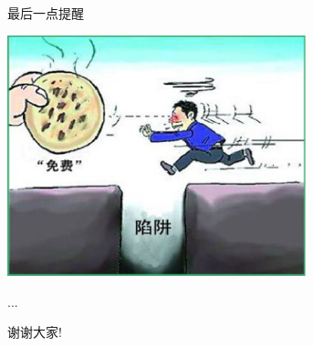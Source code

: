 \documentclass[dvipdfm]{beamer}
\begin{document}
\begin{frame}[t]{最后一点提醒}
  \begin{center}
  \includegraphics[height=7cm]{figure/warning.eps}
  \end{center}
\end{frame}

\begin{frame}[t]{...}
\vspace{5em}
\begin{center}
\Huge{谢谢大家!}
\end{center}
\end{frame}
\end{document}
